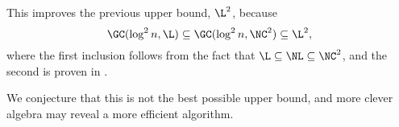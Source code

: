 \documentclass{article}
\begin{document}
This improves the previous upper bound, $\L^2$, because
\begin{equation*}
  \GC(\log^2 n, \L) \subseteq \GC(\log^2 n, \NC^2) \subseteq \L^2,
\end{equation*}
where the first inclusion follows from the fact that $\L \subseteq \NL \subseteq \NC^2$, and the second is proven in \cite[Lemma~3.2.8]{wolf90}.



We conjecture that this is not the best possible upper bound, and more clever algebra may reveal a more efficient algorithm.

\end{document}
